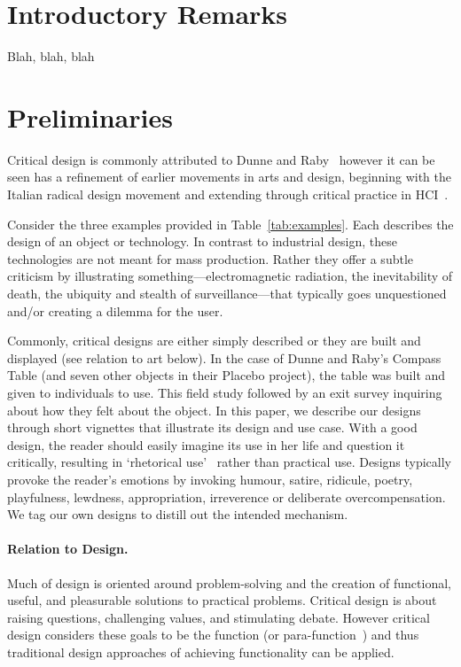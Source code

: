 
\section{Introductory Remarks}

Blah, blah, blah

\section{Preliminaries}



Critical design is commonly attributed to Dunne and Raby~\cite{DuRa01,Dun05} however it can be seen has a refinement of earlier movements in arts and design, beginning with the Italian radical design movement and extending through critical practice in HCI~\cite{Mal17}. 

Consider the three examples provided in Table~\ref{tab:examples}. Each describes the design of an object or technology. In contrast to industrial design, these technologies are not meant for mass production. Rather they offer a subtle criticism by illustrating something---electromagnetic radiation, the inevitability of death, the ubiquity and stealth of surveillance---that typically goes unquestioned and/or creating a dilemma for the user.

Commonly, critical designs are either simply described or they are built and displayed (see relation to art below). In the case of Dunne and Raby's Compass Table (and seven other objects in their Placebo project), the table was built and given to individuals to use. This field study followed by an exit survey inquiring about how they felt about the object. In this paper, we describe our designs through short vignettes that illustrate its design and use case. With a good design, the reader should easily imagine its use in her life and question it critically, resulting in `rhetorical use'~\cite{Mal17} rather than practical use. Designs typically provoke the reader's emotions by invoking humour, satire, ridicule, poetry, playfulness, lewdness, appropriation, irreverence or deliberate overcompensation. We tag our own designs to distill out the intended mechanism.

\paragraph{Relation to Design.}

Much of design is oriented around problem-solving and the creation of functional, useful, and pleasurable solutions to practical problems. Critical design is about raising questions, challenging values, and stimulating debate. However critical design considers these goals to be the function (or para-function~\cite{Dun05}) and thus traditional design approaches of achieving functionality can be applied. 


